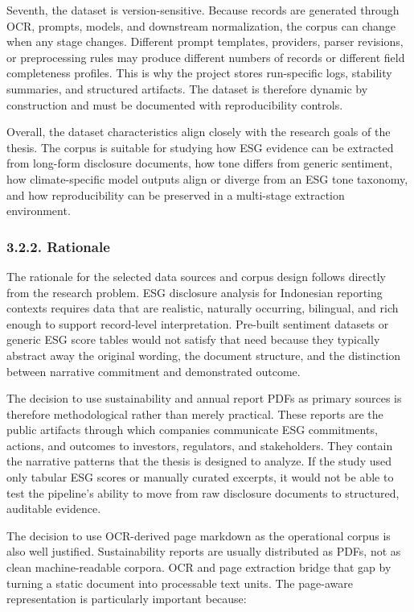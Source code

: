 \documentclass{article}
\begin{document}
Seventh, the dataset is version-sensitive. Because records are generated through OCR, prompts, models, and downstream normalization, the corpus can change when any stage changes. Different prompt templates, providers, parser revisions, or preprocessing rules may produce different numbers of records or different field completeness profiles. This is why the project stores run-specific logs, stability summaries, and structured artifacts. The dataset is therefore dynamic by construction and must be documented with reproducibility controls.

Overall, the dataset characteristics align closely with the research goals of the thesis. The corpus is suitable for studying how ESG evidence can be extracted from long-form disclosure documents, how tone differs from generic sentiment, how climate-specific model outputs align or diverge from an ESG tone taxonomy, and how reproducibility can be preserved in a multi-stage extraction environment.
\subsubsection*{ 3.2.2. Rationale}

The rationale for the selected data sources and corpus design follows directly from the research problem. ESG disclosure analysis for Indonesian reporting contexts requires data that are realistic, naturally occurring, bilingual, and rich enough to support record-level interpretation. Pre-built sentiment datasets or generic ESG score tables would not satisfy that need because they typically abstract away the original wording, the document structure, and the distinction between narrative commitment and demonstrated outcome.

The decision to use sustainability and annual report PDFs as primary sources is therefore methodological rather than merely practical. These reports are the public artifacts through which companies communicate ESG commitments, actions, and outcomes to investors, regulators, and stakeholders. They contain the narrative patterns that the thesis is designed to analyze. If the study used only tabular ESG scores or manually curated excerpts, it would not be able to test the pipeline’s ability to move from raw disclosure documents to structured, auditable evidence.

The decision to use OCR-derived page markdown as the operational corpus is also well justified. Sustainability reports are usually distributed as PDFs, not as clean machine-readable corpora. OCR and page extraction bridge that gap by turning a static document into processable text units. The page-aware representation is particularly important because:
\end{document}
